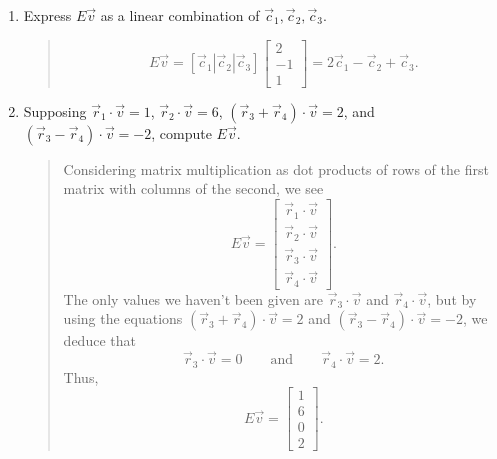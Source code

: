 \documentclass[letter]{article}
\newcommand{\mat}[1]{\begin{bmatrix}#1\end{bmatrix}}
\begin{document}
\begin{enumerate}
			\begin{enumerate}
				\item Express $E\vec v$ as a linear combination of $\vec c_1,\vec c_2,\vec c_3$.
					\begin{quote}
						\[
							E\vec v = [\vec c_1|\vec c_2|\vec c_3]\mat{2\\-1\\1} = 2\vec c_1-\vec c_2+\vec c_3.
						\]
					\end{quote}
				\item Supposing $\vec r_1\cdot \vec v=1$, $\vec r_2\cdot \vec v=6$, $(\vec r_3+\vec r_4)\cdot \vec v=2$,
					and $(\vec r_3-\vec r_4)\cdot \vec v=-2$, compute $E\vec v$.
					\begin{quote}
						Considering matrix multiplication as dot products of rows of the first matrix with columns
						of the second, we see
						\[
							E\vec v = \mat{ \vec r_1\cdot\vec v\\
									\vec r_2\cdot\vec v\\
									\vec r_3\cdot\vec v\\
									\vec r_4\cdot\vec v}.
						\]
						The only values we haven't been given are
						$\vec r_3\cdot \vec v$ and $\vec r_4\cdot \vec v$, but by using the equations
						$(\vec r_3+\vec r_4)\cdot \vec v=2$
						and $(\vec r_3-\vec r_4)\cdot \vec v=-2$, we deduce that
						\[
							\vec r_3\cdot \vec v = 0\qquad\text{and}\qquad
							\vec r_4\cdot \vec v =2.
						\]
						Thus,
						\[
							E\vec v = \mat{1\\6\\0\\2}.
						\]


					\end{quote}
			\end{enumerate}


\end{enumerate}
\end{document}
